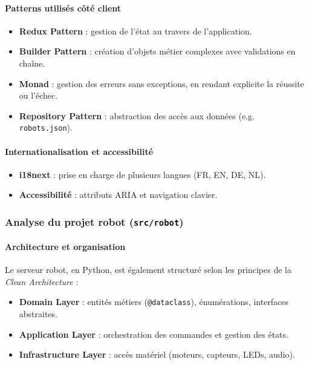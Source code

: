 \paragraph{Patterns utilisés côté client}
\begin{itemize}
    \item \textbf{Redux Pattern} : gestion de l'état au travers de l'application.
    \item \textbf{Builder Pattern} : création d’objets métier complexes avec validations en chaîne.
    \item \textbf{Monad} : gestion des erreurs sans exceptions, en rendant explicite la réussite ou l’échec.
    \item \textbf{Repository Pattern} : abstraction des accès aux données (e.g. \texttt{robots.json}).
\end{itemize}

\paragraph{Internationalisation et accessibilité}
\begin{itemize}
    \item \textbf{i18next} : prise en charge de plusieurs langues (FR, EN, DE, NL).
    \item \textbf{Accessibilité} : attributs ARIA et navigation clavier.
\end{itemize}

\subsubsection{Analyse du projet robot (\texttt{src/robot})}

\paragraph{Architecture et organisation}
Le serveur robot, en Python, est également structuré selon les principes de la \textit{Clean Architecture} :  
\begin{itemize}
    \item \textbf{Domain Layer} : entités métiers (\texttt{@dataclass}), énumérations, interfaces abstraites.
    \item \textbf{Application Layer} : orchestration des commandes et gestion des états.
    \item \textbf{Infrastructure Layer} : accès matériel (moteurs, capteurs, LEDs, audio).
\end{itemize}

